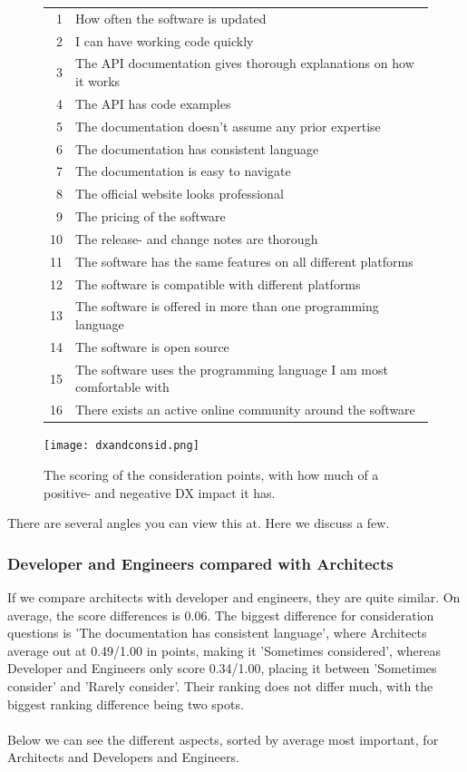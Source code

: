 \documentclass{article}
\begin{document}
\begin{figure}[H]
\centering
\begin{tabular}{r l}
\hline
1    & How often the software is updated    \\
2    & I can have working code quickly  \\
3    & The API documentation gives thorough explanations on how it works    \\
4    & The API has code examples    \\
5    & The documentation doesn't assume any prior expertise \\
6    & The documentation has consistent language    \\
7    & The documentation is easy to navigate    \\
8    & The official website looks professional  \\
9    & The pricing of the software  \\
10    &  The release- and change notes are thorough \\
11   &  The software has the same features on all different platforms   \\
12    &  The software is compatible with different platforms    \\
13  &  The software is offered in more than one programming language    \\
14    &  The software is open source    \\
15    &  The software uses the programming language I am most comfortable with  \\
16    &  There exists an active online community around the software    \\ \hline
\end{tabular}
\hspace*{-0.25\textwidth}\texttt{[image: dxandconsid.png]}
\caption{The scoring of the consideration points, with how much of a positive- and negeative DX impact it has.}
\label{fig:dxandcosnid}
\end{figure}
There are several angles you can view this at. Here we discuss a few.

\subsubsection{Developer and Engineers compared with Architects}
If we compare architects with developer and engineers, they
are quite similar. On average, the score differences is 0.06. The
biggest difference for consideration questions is 'The documentation has
consistent language', where Architects average out at 0.49/1.00 in
points, making it 'Sometimes considered', whereas Developer and
Engineers only score 0.34/1.00, placing it between 'Sometimes consider'
and 'Rarely consider'. Their ranking does not differ much, with the
biggest ranking difference being two spots.
\\ \\
Below we can see the different aspects, sorted by average most
important, for Architects and Developers and Engineers.
\end{document}
